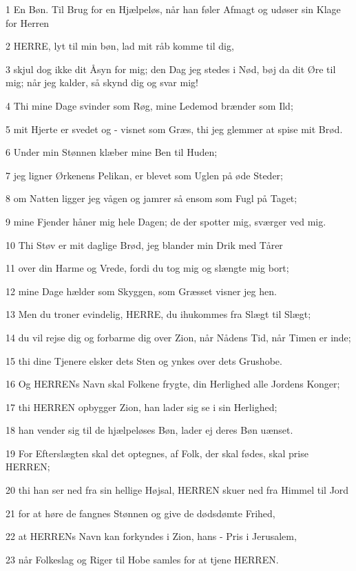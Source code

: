 \par 1 En Bøn. Til Brug for en Hjælpeløs, når han føler Afmagt og udøser sin Klage for Herren
\par 2 HERRE, lyt til min bøn, lad mit råb komme til dig,
\par 3 skjul dog ikke dit Åsyn for mig; den Dag jeg stedes i Nød, bøj da dit Øre til mig; når jeg kalder, så skynd dig og svar mig!
\par 4 Thi mine Dage svinder som Røg, mine Ledemod brænder som Ild;
\par 5 mit Hjerte er svedet og - visnet som Græs, thi jeg glemmer at spise mit Brød.
\par 6 Under min Stønnen klæber mine Ben til Huden;
\par 7 jeg ligner Ørkenens Pelikan, er blevet som Uglen på øde Steder;
\par 8 om Natten ligger jeg vågen og jamrer så ensom som Fugl på Taget;
\par 9 mine Fjender håner mig hele Dagen; de der spotter mig, sværger ved mig.
\par 10 Thi Støv er mit daglige Brød, jeg blander min Drik med Tårer
\par 11 over din Harme og Vrede, fordi du tog mig og slængte mig bort;
\par 12 mine Dage hælder som Skyggen, som Græsset visner jeg hen.
\par 13 Men du troner evindelig, HERRE, du ihukommes fra Slægt til Slægt;
\par 14 du vil rejse dig og forbarme dig over Zion, når Nådens Tid, når Timen er inde;
\par 15 thi dine Tjenere elsker dets Sten og ynkes over dets Grushobe.
\par 16 Og HERRENs Navn skal Folkene frygte, din Herlighed alle Jordens Konger;
\par 17 thi HERREN opbygger Zion, han lader sig se i sin Herlighed;
\par 18 han vender sig til de hjælpeløses Bøn, lader ej deres Bøn uænset.
\par 19 For Efterslægten skal det optegnes, af Folk, der skal fødes, skal prise HERREN;
\par 20 thi han ser ned fra sin hellige Højsal, HERREN skuer ned fra Himmel til Jord
\par 21 for at høre de fangnes Stønnen og give de dødsdømte Frihed,
\par 22 at HERRENs Navn kan forkyndes i Zion, hans - Pris i Jerusalem,
\par 23 når Folkeslag og Riger til Hobe samles for at tjene HERREN.
